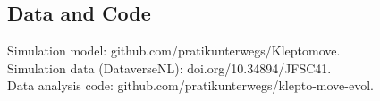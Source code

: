 \subsection*{Data and Code}
Simulation model: github.com/pratikunterwegs/Kleptomove.\\ %
\noindent Simulation data (DataverseNL): doi.org/10.34894/JFSC41.\\
\noindent Data analysis code: github.com/pratikunterwegs/klepto-move-evol.%

\clearpage
